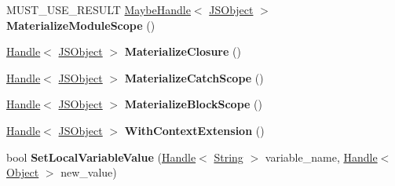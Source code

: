 \begin{DoxyCompactItemize}
\item 
M\+U\+S\+T\+\_\+\+U\+S\+E\+\_\+\+R\+E\+S\+U\+LT \hyperlink{classv8_1_1internal_1_1_maybe_handle}{Maybe\+Handle}$<$ \hyperlink{classv8_1_1internal_1_1_j_s_object}{J\+S\+Object} $>$ {\bfseries Materialize\+Module\+Scope} ()\hypertarget{classv8_1_1internal_1_1_scope_iterator_af958d26a7a38e3a361a5a956f21bd8fb}{}\label{classv8_1_1internal_1_1_scope_iterator_af958d26a7a38e3a361a5a956f21bd8fb}

\item 
\hyperlink{classv8_1_1internal_1_1_handle}{Handle}$<$ \hyperlink{classv8_1_1internal_1_1_j_s_object}{J\+S\+Object} $>$ {\bfseries Materialize\+Closure} ()\hypertarget{classv8_1_1internal_1_1_scope_iterator_ac71351c457171e27b3703b2ba6ea7040}{}\label{classv8_1_1internal_1_1_scope_iterator_ac71351c457171e27b3703b2ba6ea7040}

\item 
\hyperlink{classv8_1_1internal_1_1_handle}{Handle}$<$ \hyperlink{classv8_1_1internal_1_1_j_s_object}{J\+S\+Object} $>$ {\bfseries Materialize\+Catch\+Scope} ()\hypertarget{classv8_1_1internal_1_1_scope_iterator_a7eeef3f372f2ad2af04bb860e3d4fe60}{}\label{classv8_1_1internal_1_1_scope_iterator_a7eeef3f372f2ad2af04bb860e3d4fe60}

\item 
\hyperlink{classv8_1_1internal_1_1_handle}{Handle}$<$ \hyperlink{classv8_1_1internal_1_1_j_s_object}{J\+S\+Object} $>$ {\bfseries Materialize\+Block\+Scope} ()\hypertarget{classv8_1_1internal_1_1_scope_iterator_afdd9d9b8976a1de2cd879c1c52eafff7}{}\label{classv8_1_1internal_1_1_scope_iterator_afdd9d9b8976a1de2cd879c1c52eafff7}

\item 
\hyperlink{classv8_1_1internal_1_1_handle}{Handle}$<$ \hyperlink{classv8_1_1internal_1_1_j_s_object}{J\+S\+Object} $>$ {\bfseries With\+Context\+Extension} ()\hypertarget{classv8_1_1internal_1_1_scope_iterator_a7c7362776e6f790195a82e4b8fe9846c}{}\label{classv8_1_1internal_1_1_scope_iterator_a7c7362776e6f790195a82e4b8fe9846c}

\item 
bool {\bfseries Set\+Local\+Variable\+Value} (\hyperlink{classv8_1_1internal_1_1_handle}{Handle}$<$ \hyperlink{classv8_1_1internal_1_1_string}{String} $>$ variable\+\_\+name, \hyperlink{classv8_1_1internal_1_1_handle}{Handle}$<$ \hyperlink{classv8_1_1internal_1_1_object}{Object} $>$ new\+\_\+value)\hypertarget{classv8_1_1internal_1_1_scope_iterator_a2cd6e28d476c672dca87d9e4651a5578}{}\label{classv8_1_1internal_1_1_scope_iterator_a2cd6e28d476c672dca87d9e4651a5578}


\end{DoxyCompactItemize}
